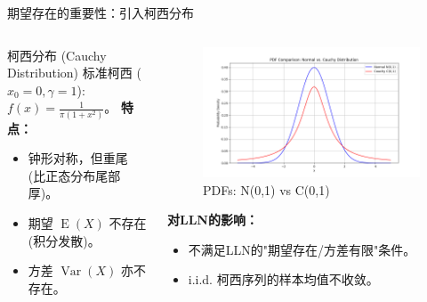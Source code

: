 \documentclass[UTF8]{beamer}
\DeclareMathOperator{\E}{\operatorname{E}}
\DeclareMathOperator{\Var}{\operatorname{Var}}
\begin{document}
\begin{frame}[shrink=10]{期望存在的重要性：引入柯西分布}
\begin{columns}[T]
\begin{column}{0.55\textwidth}
\begin{block}{柯西分布 (Cauchy Distribution)}
                标准柯西 ($x_0=0, \gamma=1$): $f(x) = \frac{1}{\pi (1+x^2)}$。
                \textbf{特点：}
                \begin{itemize}
                    \item 钟形对称，但\alert{重尾} (比正态分布尾部厚)。
                    \item \alert{期望 $\E(X)$ 不存在} (积分发散)。
                    \item \alert{方差 $\Var(X)$ 亦不存在}。
                \end{itemize}
            \end{block}
        \end{column}
        \begin{column}{0.4\textwidth}
            \begin{figure}
                \centering
                \includegraphics[width=\linewidth]{pdf_normal_cauchy_comparison.png} %
                \caption*{PDFs: N(0,1) vs C(0,1)} %
            \end{figure}
            \textbf{对LLN的影响：}
            \begin{itemize}
                \item 不满足LLN的"期望存在/方差有限"条件。
                \item i.i.d. 柯西序列的样本均值\alert{不收敛}。
            \end{itemize}
        \end{column}
    \end{columns}

\end{frame}
\end{document}
